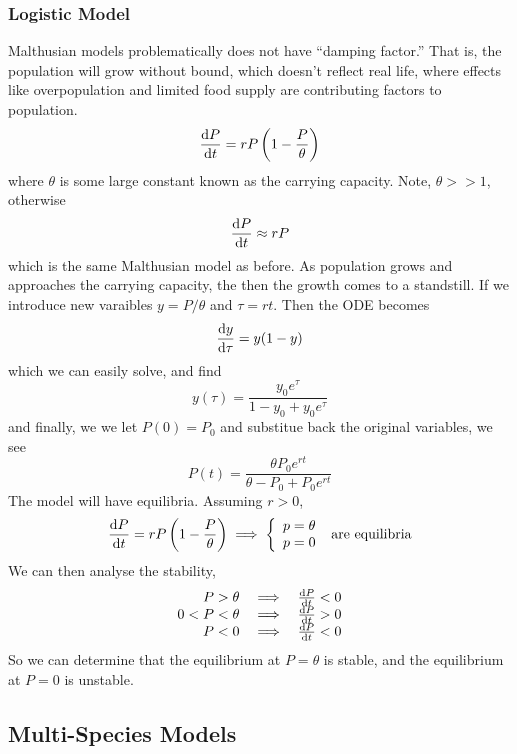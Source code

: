\documentclass{report}
\begin{document}
\subsubsection*{Logistic Model}
Malthusian models problematically does not have ``damping factor.'' That is, the population will grow without bound, which doesn't reflect real life, where effects like overpopulation and limited food supply are contributing factors to population. 
$$
	\dyd[P]{t} = rP\bracks{1 - \frac{P}{\theta}}
$$
where $\theta$ is some large constant known as the carrying capacity. Note, $\theta >> 1$, otherwise
$$
	\dyd[P]{t}\approx rP
$$
which is the same Malthusian model as before. As population grows and approaches the carrying capacity, the then the growth comes to a standstill. If we introduce new varaibles $y = P/\theta$ and $\tau=rt$. Then the ODE becomes
$$
	\dyd{\tau} = y(1-y)
$$
which we can easily solve, and find
$$
	y(\tau) = \frac{y_0e^\tau}{1-y_0 + y_0e^\tau}
$$
and finally, we we let $P(0)=P_0$ and substitue back the original variables, we see
$$
	P(t) = \frac{\theta P_0e^{rt}}{\theta - P_0 + P_0e^{rt}}
$$
The model will have equilibria. Assuming $r>0$,
$$
	\dyd[P]{t} = rP\bracks{1 - \frac{P}{\theta}} \implies \left\lbrace \begin{array}{l} p = \theta \\ p=0	\end{array} \right.\ \text{are equilibria}
$$
We can then analyse the stability,
$$
	\begin{array}{rcl}
		P > \theta 			& \implies 	& \dyd[P]{t} < 0 \\
		0 < P < \theta 	& \implies 	& \dyd[P]{t} > 0 \\
		P < 0 					& \implies	& \dyd[P]{t} < 0 \\
	\end{array}
$$
So we can determine that the equilibrium at $P=\theta$ is stable, and the equilibrium at $P=0$ is unstable.

\subsection*{Multi-Species Models}
\end{document}
